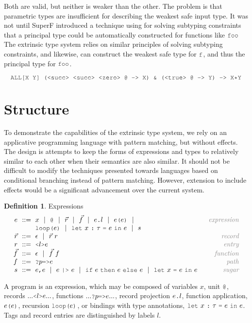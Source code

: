 \documentclass[acmsmall]{acmart}
\theoremstyle{definition}
\newtheorem{definition}{Definition}[section]
\begin{document}
Both are valid, but neither is weaker than the other. The problem is that parametric
types are insufficient for describing the weakest safe input type.
It was not until SuperF introduced a technique using for solving subtyping constraints
that a principal type could be automatically constructed for functions like $\J{foo}$
The extrinsic type system relies on similar principles of solving subtyping constraints,
and likewise, can construct the weakest safe type for $\J{f}$, and thus the principal type for $\J{foo}$.

\[
  \J{ALL[X Y] (<succ> <succ> <zero> @ -> X) \& (<true> @ -> Y) -> X*Y}
\]


\section{Structure}
\label{sec:structure}
To demonstrate the capabilities of the extrinsic type system, we rely on an applicative
programming language with pattern matching, but without effects.
The design is attempts to keep the forms of expressions and types to relatively 
similar to each other when their semantics are also similar. 
It should not be difficult to modify the techniques presented towards
languages based on conditional branching instead of pattern matching. However,
extension to include effects would be a significant advancement over the current
system.

\begin{definition} Expressions
  \label{def:expressions}
  \[\begin{array}[t]{r@{}l@{}r}
    \nonterm{e} 
    & 
    \is 
    \begin{array}[t]{@{}l}
      x \sep 
      \J{@} \sep
      \vec{r} \sep
      \vec{f} \sep 
      e\J{.}l \sep
      e\J{(}e\J{)} \sep
      \\
      \J{loop(}e\J{)} \sep
      \J{let}\ x\ \J{:}\ \tau\ \J{=}\ e\ \J{in}\ e \sep
      s
    \end{array}
    & \com{expression}
    \\
    \nonterm{\vec{r}} & \is \epsilon \sep \vec{r}\ r 
    & \com{record}
    \\
    \nonterm{r} & \is \J{<}l\J{>}e
    & \com{entry}
    \\
    \nonterm{\vec{f}} & \is \epsilon \sep \vec{f}\ f
    & \com{function}
    \\
    \nonterm{f} & \is \J{?}p\J{=>}e
    & \com{path}
    \\
    \nonterm{s} 
    & 
    \is 
    \begin{array}[t]{@{}l}
      e \J{,} e \sep
      e\ \J{|>}\ e \sep
      \J{if}\ e\ \J{then}\ e\ \J{else}\ e \sep
      \J{let}\ x\ \J{=}\ e\ \J{in}\ e
    \end{array}
    & \com{sugar}
  \end{array}\]
\end{definition}
A program is an expression, which may be composed of variables $x$, unit $\J{@}$,
records $... \J{<}l\J{>} e ...$, functions $...\J{?}p \J{=>} e ...$, record
projection $e\J{.}l$, function application, $e\J{(}e\J{)}$, recursion $\J{loop(}e\J{)}$,
or bindings with type annotations, $\J{let}\ x\ \J{:}\ \tau\ \J{=}\ e\ \J{in}\ e$.
Tags and record entries are distinguished by labels $l$.
\end{document}
